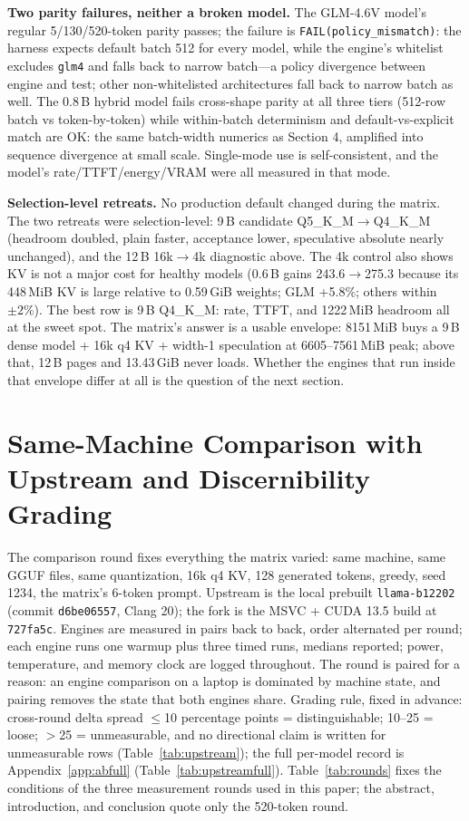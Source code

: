 \documentclass[letterpaper,twocolumn,10pt]{article}
\begin{document}
\textbf{Two parity failures, neither a broken model.} The GLM-4.6V model's
regular 5/130/520-token parity passes; the failure is
\texttt{FAIL(policy\_mismatch)}: the harness expects default batch 512 for
every model, while the engine's whitelist excludes \texttt{glm4} and falls
back to narrow batch---a policy divergence between engine and test; other
non-whitelisted architectures fall back to narrow batch as well. The 0.8\,B
hybrid model fails cross-shape parity at all three tiers (512-row batch vs
token-by-token) while within-batch determinism and default-vs-explicit match
are OK: the same batch-width numerics as Section 4, amplified into sequence
divergence at small scale. Single-mode use is self-consistent, and the model's
rate/TTFT/energy/VRAM were all measured in that mode.

\textbf{Selection-level retreats.} No production default changed during the
matrix. The two retreats were selection-level: 9\,B candidate
Q5\_K\_M$\rightarrow$Q4\_K\_M (headroom doubled, plain faster, acceptance
lower, speculative absolute nearly unchanged), and the 12\,B
16k$\rightarrow$4k diagnostic above. The 4k control also shows KV is not a
major cost for healthy models (0.6\,B gains 243.6$\rightarrow$275.3 because
its 448\,MiB KV is large relative to 0.59\,GiB weights; GLM +5.8\%; others
within $\pm2\%$). The best row is 9\,B Q4\_K\_M: rate, TTFT, and 1222\,MiB
headroom all at the sweet spot. The matrix's answer is a usable envelope:
8151\,MiB buys a 9\,B dense model + 16k q4 KV + width-1 speculation at
6605--7561\,MiB peak; above that, 12\,B pages and 13.43\,GiB never loads.
Whether the engines that run inside that envelope differ at all is the
question of the next section.

\section{Same-Machine Comparison with Upstream and Discernibility Grading}
\label{sec:upstream}

The comparison round fixes everything the matrix varied: same machine, same
GGUF files, same quantization, 16k q4 KV, 128 generated tokens, greedy, seed
1234, the matrix's 6-token prompt. Upstream is the local prebuilt
\texttt{llama-b12202} (commit \texttt{d6be06557}, Clang 20); the fork is the
MSVC + CUDA 13.5 build at \texttt{727fa5c}. Engines are measured in pairs back
to back, order alternated per round; each engine runs one warmup plus three
timed runs, medians reported; power, temperature, and memory clock are logged
throughout. The round is paired for a reason: an engine comparison on a laptop
is dominated by machine state, and pairing removes the state that both engines
share. Grading rule, fixed in advance: cross-round delta spread
$\le$10 percentage points = distinguishable; 10--25 = loose; $>$25 =
unmeasurable, and no directional claim is written for unmeasurable rows
(Table~\ref{tab:upstream}); the full per-model record is
Appendix~\ref{app:abfull} (Table~\ref{tab:upstreamfull}).
Table~\ref{tab:rounds} fixes the conditions of the
three measurement rounds used in this paper; the abstract, introduction, and
conclusion quote only the 520-token round.
\end{document}
